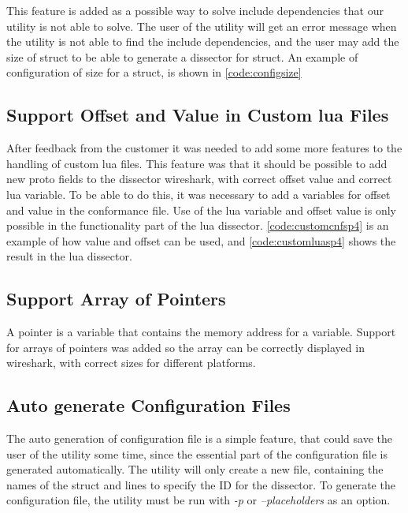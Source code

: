 This feature is added as a possible way to solve include dependencies that our 
\gls{utility} is not able to solve. The user of the \gls{utility} will get an error 
message when the \gls{utility} is not able to find the include dependencies, and the 
user may add the size of \gls{struct} to be able to generate a \gls{dissector} for \gls{struct}. 
An example of configuration of size for a \gls{struct}, is shown in 
\autoref{code:configsize}



\subsection{Support Offset and Value in Custom \Gls{lua} Files}
After feedback from the customer it was needed to add some more features to 
the handling of custom \Gls{lua} files. This feature was that it should be possible 
to add new proto fields to the \gls{dissector} \Gls{wireshark}, with correct offset value 
and correct \Gls{lua} variable. To be able to do this, it was necessary to add a 
variables for offset and value in the conformance file. Use of the \Gls{lua} 
variable and offset value is only possible in the functionality part of the 
\Gls{lua} \gls{dissector}. \autoref{code:customcnfsp4} is an example of how value and 
offset can be used, and \autoref{code:customluasp4} shows the result in the \Gls{lua} 
\gls{dissector}.





\subsection{Support Array of Pointers}
A pointer is a variable that contains the memory address for a variable. 
Support for arrays of pointers was added so the array can be correctly 
displayed in \Gls{wireshark}, with correct sizes for different platforms.

\subsection{Auto generate Configuration Files}
The auto generation of configuration file is a simple feature, that could save 
the user of the \gls{utility} some time, since the essential part of the 
configuration file is generated automatically. The \gls{utility} will only create a new 
file, containing the names of the \gls{struct} and lines to specify the ID for the 
\gls{dissector}. To generate the configuration file, the \gls{utility} must be run with 
\emph{-p} or \emph{--placeholders} as an option.

